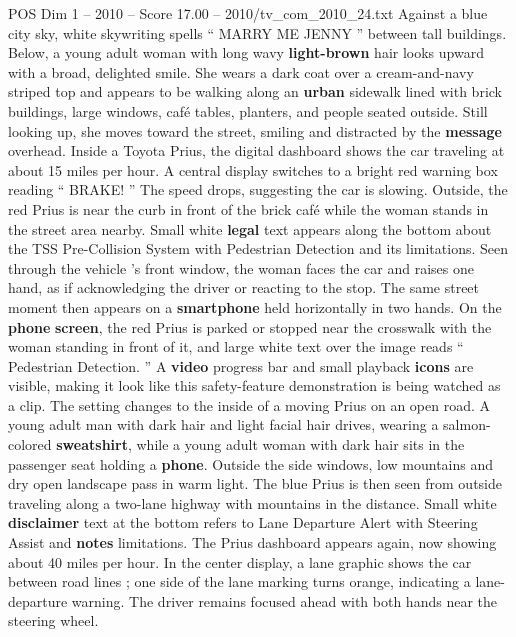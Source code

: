 \begin{textsample}{POS Dim 1 – 2010 – Score 17.00 – 2010/tv\_com\_2010\_24.txt}  \label{ex:f1_pos_023}
Against a blue city sky, white skywriting spells “ MARRY ME JENNY ” between tall buildings.
Below, a young adult woman with long wavy \textbf{light-brown} hair looks upward with a broad, delighted smile.
She wears a dark coat over a cream-and-navy striped top and appears to be walking along an \textbf{urban} sidewalk lined with brick buildings, large windows, café tables, planters, and people seated outside.
Still looking up, she moves toward the street, smiling and distracted by the \textbf{message} overhead.
Inside a Toyota Prius, the digital dashboard shows the car traveling at about 15 miles per hour.
A central display switches to a bright red warning box reading “ BRAKE! ” The speed drops, suggesting the car is slowing.
Outside, the red Prius is near the curb in front of the brick café while the woman stands in the street area nearby.
Small white \textbf{legal} text appears along the bottom about the TSS Pre-Collision System with Pedestrian Detection and its limitations.
Seen through the vehicle ’s front window, the woman faces the car and raises one hand, as if acknowledging the driver or reacting to the stop.
The same street moment then appears on a \textbf{smartphone} held horizontally in two hands.
On the \textbf{phone} \textbf{screen}, the red Prius is parked or stopped near the crosswalk with the woman standing in front of it, and large white text over the image reads “ Pedestrian Detection. ” A \textbf{video} progress bar and small playback \textbf{icons} are visible, making it look like this safety-feature demonstration is being watched as a clip.
The setting changes to the inside of a moving Prius on an open road.
A young adult man with dark hair and light facial hair drives, wearing a salmon-colored \textbf{sweatshirt}, while a young adult woman with dark hair sits in the passenger seat holding a \textbf{phone}.
Outside the side windows, low mountains and dry open landscape pass in warm light.
The blue Prius is then seen from outside traveling along a two-lane highway with mountains in the distance.
Small white \textbf{disclaimer} text at the bottom refers to Lane Departure Alert with Steering Assist and \textbf{notes} limitations.
The Prius dashboard appears again, now showing about 40 miles per hour.
In the center display, a lane graphic shows the car between road lines ; one side of the lane marking turns orange, indicating a lane-departure warning.
The driver remains focused ahead with both hands near the steering wheel.

\end{textsample}

